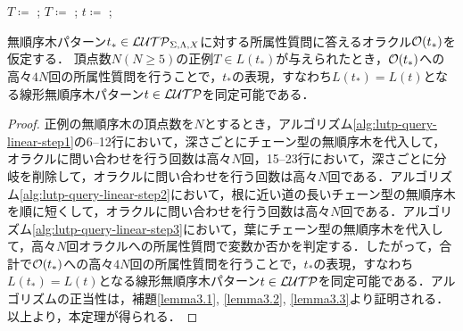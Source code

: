 \begin{algorithm}[tb]
\caption{${\cal LUTP}$-${\cal QUERY}_{{\cal O}(t_{\ast})}^{Linear}$} \label{alg:lutp-query-linear}
\begin{algorithmic}[1]
  \State $T\coloneqq $ ;
  \State $T\coloneqq $ ;
  \State $t\coloneqq $ ;
\end{algorithmic}
\end{algorithm}

\begin{theorem}\label{theorem3}
  無順序木パターン$t_{\ast}\in {\cal LUTP}_{\Sigma, \Lambda, X}$に対する所属性質問に答えるオラクル${\cal O}(t_{\ast})$を仮定する．
  頂点数$N(N\geq 5)$の正例$T\in L(t_{\ast})$が与えられたとき，${\cal O}(t_{\ast})$への高々$4N$回の所属性質問を行うことで，$t_\ast$の表現，すなわち$L(t_\ast)=L(t)$となる線形無順序木パターン$t\in{\cal LUTP}$を同定可能である．
\end{theorem}

\begin{proof}
  正例の無順序木の頂点数を$N$とするとき，アルゴリズム\ref{alg:lutp-query-linear-step1}の6--12行において，深さごとにチェーン型の無順序木を代入して，オラクルに問い合わせを行う回数は高々$N$回，15--23行において，深さごとに分岐を削除して，オラクルに問い合わせを行う回数は高々$N$回である．アルゴリズム\ref{alg:lutp-query-linear-step2}において，根に近い道の長いチェーン型の無順序木を順に短くして，オラクルに問い合わせを行う回数は高々$N$回である．アルゴリズム\ref{alg:lutp-query-linear-step3}において，葉にチェーン型の無順序木を代入して，高々$N$回オラクルへの所属性質問で変数か否かを判定する．したがって，合計で${\cal O}(t_{\ast})$への高々$4N$回の所属性質問を行うことで，$t_\ast$の表現，すなわち$L(t_\ast)=L(t)$となる線形無順序木パターン$t\in{\cal LUTP}$を同定可能である．アルゴリズムの正当性は，補題\ref{lemma3.1}, \ref{lemma3.2}, \ref{lemma3.3}より証明される．以上より，本定理が得られる．
\end{proof}

